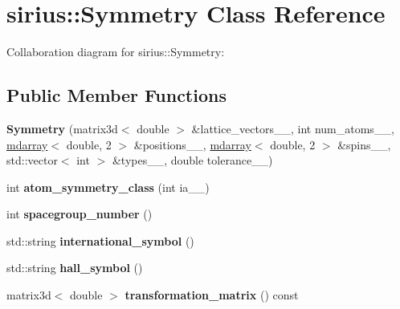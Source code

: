 \hypertarget{classsirius_1_1_symmetry}{}\section{sirius\+:\+:Symmetry Class Reference}
\label{classsirius_1_1_symmetry}


Collaboration diagram for sirius\+:\+:Symmetry\+:
\subsection*{Public Member Functions}
\begin{DoxyCompactItemize}
\item 
\hypertarget{classsirius_1_1_symmetry_a5432adc5450608ceb92e7bd4cbb164db}{}{\bfseries Symmetry} (matrix3d$<$ double $>$ \&lattice\+\_\+vectors\+\_\+\+\_\+, int num\+\_\+atoms\+\_\+\+\_\+, \hyperlink{classsddk_1_1mdarray}{mdarray}$<$ double, 2 $>$ \&positions\+\_\+\+\_\+, \hyperlink{classsddk_1_1mdarray}{mdarray}$<$ double, 2 $>$ \&spins\+\_\+\+\_\+, std\+::vector$<$ int $>$ \&types\+\_\+\+\_\+, double tolerance\+\_\+\+\_\+)\label{classsirius_1_1_symmetry_a5432adc5450608ceb92e7bd4cbb164db}

\item 
\hypertarget{classsirius_1_1_symmetry_abdee185b450973e6b6e5f37186a939b6}{}int {\bfseries atom\+\_\+symmetry\+\_\+class} (int ia\+\_\+\+\_\+)\label{classsirius_1_1_symmetry_abdee185b450973e6b6e5f37186a939b6}

\item 
\hypertarget{classsirius_1_1_symmetry_a0bbffdbac41152b1b7335c7fb3a6e519}{}int {\bfseries spacegroup\+\_\+number} ()\label{classsirius_1_1_symmetry_a0bbffdbac41152b1b7335c7fb3a6e519}

\item 
\hypertarget{classsirius_1_1_symmetry_a65f0a1f327d74d65cad40cd3c0eec1b5}{}std\+::string {\bfseries international\+\_\+symbol} ()\label{classsirius_1_1_symmetry_a65f0a1f327d74d65cad40cd3c0eec1b5}

\item 
\hypertarget{classsirius_1_1_symmetry_a711e923405ec5ef577eed7ae5a1796ab}{}std\+::string {\bfseries hall\+\_\+symbol} ()\label{classsirius_1_1_symmetry_a711e923405ec5ef577eed7ae5a1796ab}

\item 
\hypertarget{classsirius_1_1_symmetry_a712ec6360723c0e92d30417473ce594b}{}matrix3d$<$ double $>$ {\bfseries transformation\+\_\+matrix} () const \label{classsirius_1_1_symmetry_a712ec6360723c0e92d30417473ce594b}


\end{DoxyCompactItemize}
